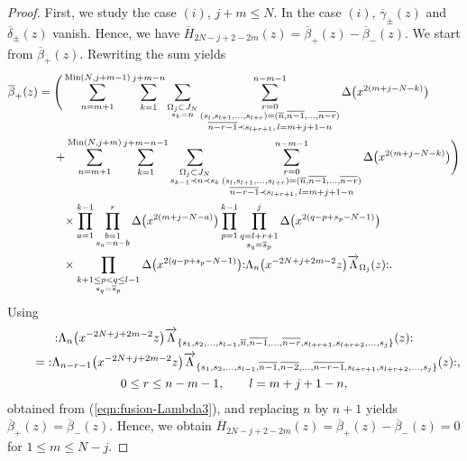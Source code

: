 \documentclass[pdftex]{sigma}
\numberwithin{equation}{section}
\begin{document}
\begin{proof}
First, we study the case $(i)$, $j+m \leq N$.
In the case $(i)$, $\overline{\gamma}_\pm(z)$ and
$\overline{\delta}_\pm(z)$ vanish. Hence, we have
$\overline{H}_{2N-j+2-2m}(z)=\overline{\beta}_+(z)-\overline{\beta}_-(z)$.
We start from $\overline{\beta}_+(z)$. Rewriting the sum yields
\begin{align}
\overline{\beta}_+(z)={}&
\Bigg(\sum_{n=m+1}^{\operatorname{Min}(N, j+m-1)}
\sum_{k=1}^{j+m-n}\sum\limits_{\substack{\Omega_j \subset J_N\\s_k=n}}
\sum\limits_{\substack{r=0\\(s_l,s_{l+1},\dots,s_{l+r})=
(\overline{n}, \overline{n-1},\dots,\overline{n-r})
\\ \overline{n-r-1}\prec s_{l+r+1},\, l=m+j+1-n}}^{n-m-1}\Delta\big(x^{2(m+j-N-k)}\big)\notag
\\
&+\sum_{n=m+1}^{\operatorname{Min}(N, j+m)}\sum_{k=1}^{j+m-n-1}
\sum\limits_{\substack{\Omega_j \subset J_N\\s_{k-1}\prec n \prec s_k}}
\sum\limits_{\substack{r=0\\(s_l,s_{l+1},\dots,s_{l+r})=
(\overline{n}, \overline{n-1},\dots,\overline{n-r})
\\ \overline{n-r-1}\prec s_{l+r+1},\, l=m+j+1-n}}^{n-m-1}
\Delta\big(x^{2(m+j-N-k)}\big)\Bigg)\notag
\\
&\phantom{+}\times\prod_{a=1}^{k-1}\prod\limits_{\substack{b=1
\\s_a=n-b}}^r \Delta\big(x^{2(m+j-N-a)}\big)
\prod_{p=1}^{k-1}\prod\limits_{\substack{q=l+r+1
\\s_q=\overline{s}_p}}^j\Delta\big(x^{2(q-p+s_p-N-1)}\big)
\notag
\\
&\phantom{+}\times\prod\limits_{\substack{k+1 \leq p<q \leq l-1\\s_q=\overline{s}_p}}
\Delta\big(x^{2(q-p+s_p-N-1)}\big)
{:}\Lambda_n\big(x^{-2N+j+2m-2}z\big)\overrightarrow{\Lambda}_{\Omega_j}(z){:}.
\label{eqn:bbeta+}
\end{align}
Using
\begin{gather}
{:}\Lambda_n\big(x^{-2N+j+2m-2}z\big)\overrightarrow{\Lambda}_{\{s_1,s_2, \dots, s_{l-1}, \overline{n}, \overline{n-1}, \dots, \overline{n-r}, s_{l+r+1}, s_{l+r+2},\dots, s_j\}}(z){:}\notag
\\ \qquad
{}={:}\Lambda_{n-r-1}\big(x^{-2N+j+2m-2}z\big)\overrightarrow{\Lambda}_{\{s_1,s_2, \dots, s_{l-1}, \overline{n-1}, \overline{n-2}, \dots, \overline{n-r-1}, s_{l+r+1}, s_{l+r+2},
\dots, s_j\}}(z){:},\notag
\\
0\leq r \leq n-m-1,\qquad l=m+j+1-n,
\label{eqn:subscript1}
\end{gather}
obtained from (\ref{eqn:fusion-Lambda3}), and replacing $n$ by $n+1$
yields $\overline{\beta}_+(z)=\overline{\beta}_-(z)$. Hence, we obtain
$\overline{H}_{2N-j+2-2m}(z)=\overline{\beta}_+(z)-\overline{\beta}_-(z)=0$
for $1\leq m \leq N-j$.


\end{proof}
\end{document}
